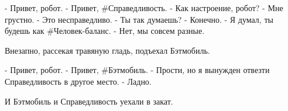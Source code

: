 - Привет, робот.
- Привет, #Справедливость.
- Как настроение, робот?
- Мне грустно.
- Это несправедливо.
- Ты так думаешь?
- Конечно.
- Я думал, ты будешь как #Человек-баланс.
- Нет, мы совсем разные.

Внезапно, рассекая травяную гладь, подъехал Бэтмобиль.

- Привет, робот.
- Привет, #Бэтмобиль.
- Прости, но я вынужден отвезти Справедливость в другое место.
- Ладно.

И Бэтмобиль и Справедливость уехали в закат.